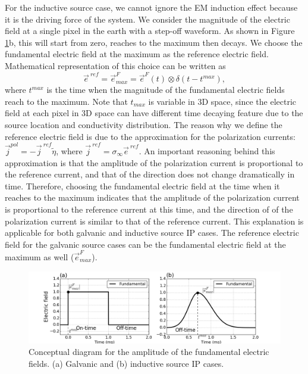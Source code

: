 \documentclass[a4paper, 11pt]{article}
\newcommand{\siginf}{\sigma_\infty}
\renewcommand {\j}  { {\vec j} }
\newcommand {\e}  { {\vec e} }
\newcommand{\peta}{\tilde{\eta}}
\begin{document}
For the inductive source case, we cannot ignore the EM induction effect because it is the driving force of the system. We consider the magnitude of the electric field at a single pixel in the earth with a step-off waveform. As shown in Figure \ref{F:DCEM_F_current}b, this will start from zero, reaches to the maximum then decays. We choose the fundamental electric field at the maximum as the reference electric field. Mathematical representation of this choice can be written as 
\begin{equation}
  \e^{\ ref} = \e^{F}_{max} = \e^{F}(t) \otimes \delta(t-t^{max}),
\end{equation}
where $t^{max}$ is the time when the magnitude of the fundamental electric fields reach to the maximum. Note that $t_{max}$ is variable in 3D space, since the electric field at each pixel in 3D space can have different time decaying feature due to the source location and conductivity distribution. The reason why we define the reference electric field is due to the approximation for the polarization currents: $\j^{pol} = -\j^{\ ref}\peta$, where $\j^{\ ref} = \siginf \e^{\ ref}$. An important reasoning behind this approximation is that the amplitude of the polarization current is proportional to the reference current, and that of the direction does not change dramatically in time. Therefore, choosing the fundamental electric field at the time when it reaches to the maximum indicates that the amplitude of the polarization current is proportional to the reference current at this time, and the direction of of the polarization current is similar to that of the reference current. This explanation is applicable for both galvanic and inductive source IP cases. The reference electric field for the galvanic source cases can be the fundamental electric field at the maximum as well ($\e^{F}_{max}$). 

\begin{figure}[htb]
  \centering  \includegraphics[width=1.0\textwidth]{figures/DCEM_F_current.png}
  \caption{Conceptual diagram for the amplitude of the fundamental electric fields. (a) Galvanic and (b) inductive source IP cases.}
  \label{F:DCEM_F_current}
\end{figure}
\end{document}
